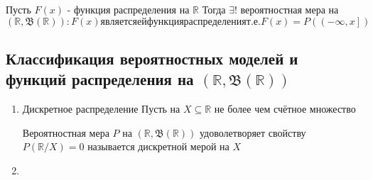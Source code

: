 \begin{theorem}	
Пусть $ F(x) $ - функция распределения на $ \mathbb{R} $ Тогда $ \exists ! $ вероятностная мера на $ (\mathbb{R},\mathfrak{B}(\mathbb{R})): F(x) является ей функция распределения т.е. F(x)=P(\left(-\infty, x\right]) $	
\end{theorem}

\subsection{Классификация вероятностных моделей и функций распределения на $ (\mathbb{R},\mathfrak{B}(\mathbb{R}))$}

\begin{enumerate}
	\item{Дискретное распределение}
	Пусть на $ X \subseteq \mathbb{R}$ не более чем счётное множество
	\begin{definition}
		Вероятностная мера $ P $ на $ (\mathbb{R},\mathfrak{B}(\mathbb{R}))$ удоволетворяет свойству $P(\mathbb{R} / X)=0$ называется дискретной мерой на $ X $
	\end{definition}	
	\item	
\end{enumerate}


